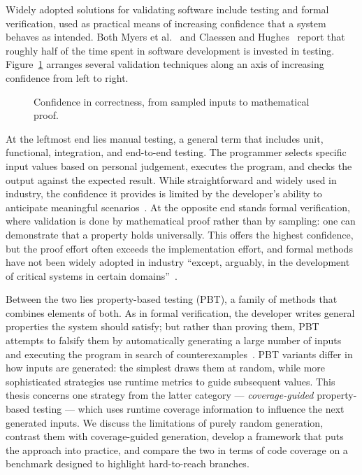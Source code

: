 \documentclass[11pt,a4paper]{report}
\begin{document}
Widely adopted solutions for validating software include testing and formal verification, used as
practical means of increasing confidence that a system behaves as intended. Both Myers et al.~\cite{myers}
and Claessen and Hughes~\cite{claessen2000} report that roughly half of the time spent in software
development is invested in testing. Figure~\ref{fig:confidence} arranges several validation techniques
along an axis of increasing confidence from left to right.

\begin{figure}[t]
\centering
{}
\caption{Confidence in correctness, from sampled inputs to mathematical proof.}
\label{fig:confidence}
\end{figure}

At the leftmost end lies manual testing, a general term that includes unit, functional, integration, and
end-to-end testing. The programmer selects specific input values based on personal judgement, executes the
program, and checks the output against the expected result. While straightforward and widely used in
industry, the confidence it provides is limited by the developer's ability to anticipate meaningful
scenarios~\cite{garousi}. At the opposite end stands formal verification, where validation is done by
mathematical proof rather than by sampling: one can demonstrate that a property holds universally. This
offers the highest confidence, but the proof effort often exceeds the implementation effort, and formal
methods have not been widely adopted in industry ``except, arguably, in the development of critical
systems in certain domains''~\cite{woodcock}.

Between the two lies property-based testing (PBT), a family of methods that combines elements of both. As
in formal verification, the developer writes general properties the system should satisfy; but rather than
proving them, PBT attempts to falsify them by automatically generating a large number of inputs and
executing the program in search of counterexamples~\cite{claessen2000}. PBT variants differ in how inputs
are generated: the simplest draws them at random, while more sophisticated strategies use runtime metrics
to guide subsequent values. This thesis concerns one strategy from the latter category — \emph{coverage-guided}
property-based testing — which uses runtime coverage information to influence the next generated inputs. We
discuss the limitations of purely random generation, contrast them with coverage-guided generation,
develop a framework that puts the approach into practice, and compare the two in terms of code coverage on
a benchmark designed to highlight hard-to-reach branches.
\end{document}
